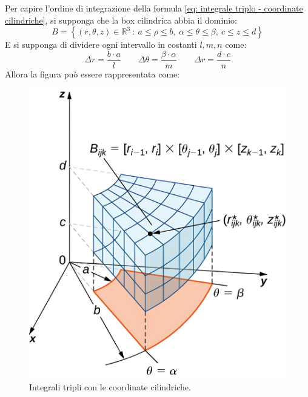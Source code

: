 \documentclass[a4paper]{article}
\begin{document}
	\noindent
	Per capire l'ordine di integrazione della formula \ref{eq: integrale triplo - coordinate cilindriche}, si supponga che la box cilindrica abbia il dominio:
	\begin{equation*}
		B = \left\{\left(r, \theta, z\right) \in \mathbb{R}^{3} \: : \: a \le \rho \le b, \: \alpha \le \theta \le \beta, \: c \le z \le d\right\}
	\end{equation*}
	E si supponga di dividere ogni intervallo in costanti $l,m,n$ come:
	\begin{equation*}
		\Delta r = \dfrac{b \cdot a}{l} \hspace{2em}
		\Delta \theta = \dfrac{\beta \cdot \alpha}{m} \hspace{2em}
		\Delta r = \dfrac{d \cdot c}{n}
	\end{equation*}
	Allora la figura può essere rappresentata come:
	\begin{figure}[!htp]
		\centering
		\includegraphics[width=.6\textwidth]{img/integrali_tripli-coordinate_cilindriche.jpg}
		\caption{Integrali tripli con le coordinate cilindriche.}
	\end{figure}
\end{document}
